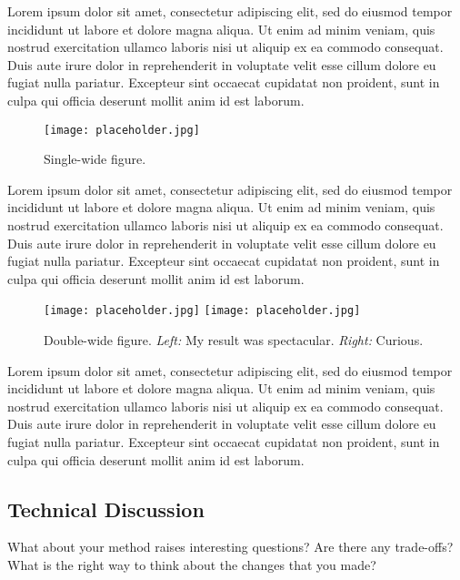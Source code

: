 \documentclass[10pt,twocolumn,letterpaper]{article}
\begin{document}
Lorem ipsum dolor sit amet, consectetur adipiscing elit, sed do eiusmod tempor incididunt ut labore et dolore magna aliqua. Ut enim ad minim veniam, quis nostrud exercitation ullamco laboris nisi ut aliquip ex ea commodo consequat. Duis aute irure dolor in reprehenderit in voluptate velit esse cillum dolore eu fugiat nulla pariatur. Excepteur sint occaecat cupidatat non proident, sunt in culpa qui officia deserunt mollit anim id est laborum.

\begin{figure}[t]
    \centering
    \texttt{[image: placeholder.jpg]}
    \caption{Single-wide figure.}
    \label{fig:result1}
\end{figure}

Lorem ipsum dolor sit amet, consectetur adipiscing elit, sed do eiusmod tempor incididunt ut labore et dolore magna aliqua. Ut enim ad minim veniam, quis nostrud exercitation ullamco laboris nisi ut aliquip ex ea commodo consequat. Duis aute irure dolor in reprehenderit in voluptate velit esse cillum dolore eu fugiat nulla pariatur. Excepteur sint occaecat cupidatat non proident, sunt in culpa qui officia deserunt mollit anim id est laborum.

\begin{figure*}[t]
    \centering
    \texttt{[image: placeholder.jpg]}
    \texttt{[image: placeholder.jpg]}
    \caption{Double-wide figure. \emph{Left:} My result was spectacular. \emph{Right:} Curious.}
    \label{fig:result2}
\end{figure*}

Lorem ipsum dolor sit amet, consectetur adipiscing elit, sed do eiusmod tempor incididunt ut labore et dolore magna aliqua. Ut enim ad minim veniam, quis nostrud exercitation ullamco laboris nisi ut aliquip ex ea commodo consequat. Duis aute irure dolor in reprehenderit in voluptate velit esse cillum dolore eu fugiat nulla pariatur. Excepteur sint occaecat cupidatat non proident, sunt in culpa qui officia deserunt mollit anim id est laborum.

\subsection{Technical Discussion}

What about your method raises interesting questions? Are there any trade-offs? What is the right way to think about the changes that you made?
\end{document}
